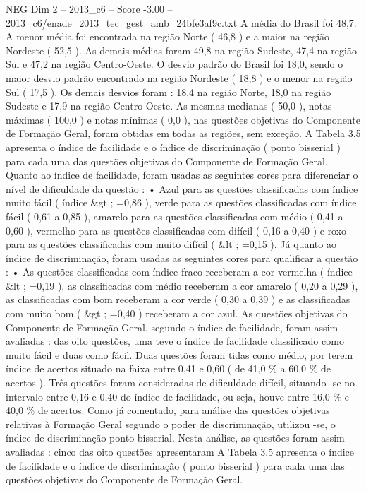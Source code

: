 \begin{textsample}{NEG Dim 2 – 2013\_c6 – Score -3.00 – 2013\_c6/enade\_2013\_tec\_gest\_amb\_24bfe3af9c.txt}
A média do Brasil foi 48,7.
A menor média foi encontrada na região Norte ( 46,8 ) e a maior na região Nordeste ( 52,5 ).
As demais médias foram 49,8 na região Sudeste, 47,4 na região Sul e 47,2 na região Centro-Oeste.
O desvio padrão do Brasil foi 18,0, sendo o maior desvio padrão encontrado na região Nordeste ( 18,8 ) e o menor na região Sul ( 17,5 ).
Os demais desvios foram : 18,4 na região Norte, 18,0 na região Sudeste e 17,9 na região Centro-Oeste.
As mesmas medianas ( 50,0 ), notas máximas ( 100,0 ) e notas mínimas ( 0,0 ), nas questões objetivas do Componente de Formação Geral, foram obtidas em todas as regiões, sem exceção.
A Tabela 3.5 apresenta o índice de facilidade e o índice de discriminação ( ponto bisserial ) para cada uma das questões objetivas do Componente de Formação Geral.
Quanto ao índice de facilidade, foram usadas as seguintes cores para diferenciar o nível de dificuldade da questão : • Azul para as questões classificadas com índice muito fácil ( índice \&gt ; =0,86 ), verde para as questões classificadas com índice fácil ( 0,61 a 0,85 ), amarelo para as questões classificadas com médio ( 0,41 a 0,60 ), vermelho para as questões classificadas com difícil ( 0,16 a 0,40 ) e roxo para as questões classificadas com muito difícil ( \&lt ; =0,15 ).
Já quanto ao índice de discriminação, foram usadas as seguintes cores para qualificar a questão : • As questões classificadas com índice fraco receberam a cor vermelha ( índice \&lt ; =0,19 ), as classificadas com médio receberam a cor amarelo ( 0,20 a 0,29 ), as classificadas com bom receberam a cor verde ( 0,30 a 0,39 ) e as classificadas com muito bom ( \&gt ; =0,40 ) receberam a cor azul.
As questões objetivas do Componente de Formação Geral, segundo o índice de facilidade, foram assim avaliadas : das oito questões, uma teve o índice de facilidade classificado como muito fácil e duas como fácil.
Duas questões foram tidas como médio, por terem índice de acertos situado na faixa entre 0,41 e 0,60 ( de 41,0 \% a 60,0 \% de acertos ).
Três questões foram consideradas de dificuldade difícil, situando -se no intervalo entre 0,16 e 0,40 do índice de facilidade, ou seja, houve entre 16,0 \% e 40,0 \% de acertos.
Como já comentado, para análise das questões objetivas relativas à Formação Geral segundo o poder de discriminação, utilizou -se, o índice de discriminação ponto bisserial.
Nesta análise, as questões foram assim avaliadas : cinco das oito questões apresentaram A Tabela 3.5 apresenta o índice de facilidade e o índice de discriminação ( ponto bisserial ) para cada uma das questões objetivas do Componente de Formação Geral.

\end{textsample}
